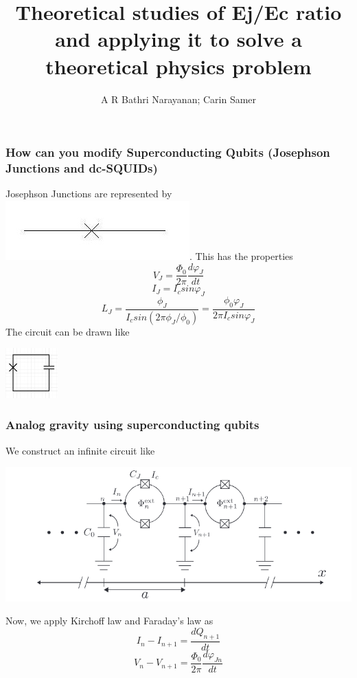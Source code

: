 \documentclass[11pt]{beamer}
\date{}
\begin{document}
	\author{A R Bathri Narayanan; Carin Samer}
	\title{Theoretical studies of Ej/Ec ratio and applying it to solve a theoretical physics problem}
	\begin{frame}[plain]
		\maketitle
	\end{frame}
	
		\begin{frame}
		\frametitle{How can you modify Superconducting Qubits (Josephson Junctions and dc-SQUIDs)}
		Josephson Junctions are represented by \includegraphics[width=1 cm]{sc7.png}. This has the properties
		\[V_J=\frac{\Phi_0}{2\pi}\frac{d\varphi_J}{dt}\]
		\[I_J=I_c sin \varphi_J\]
		\[L_J=\frac{\phi_J}{I_csin(2\pi\phi_J/\phi_0)}=\frac{\phi_0\varphi_J}{2\pi I_c sin\varphi_J}\]
		The circuit can be drawn like\\
		\begin{center}
			\includegraphics[width=2cm]{sc8.png}
		\end{center}
			\end{frame}
		
		\begin{frame}
			\frametitle{Analog gravity using superconducting qubits}
			We construct an infinite circuit like
			\begin{center}
				\includegraphics[width=8 cm]{sc9.png}
			\end{center}
			Now, we apply Kirchoff law and Faraday's law as
			\[I_n - I_{n+1}=\frac{dQ_{n+1}}{dt}\]
			\[V_n-V_{n+1}=\frac{\Phi_0}{2\pi}\frac{d\varphi_{Jn}}{dt}\]
		\end{frame}
		
\end{document}
